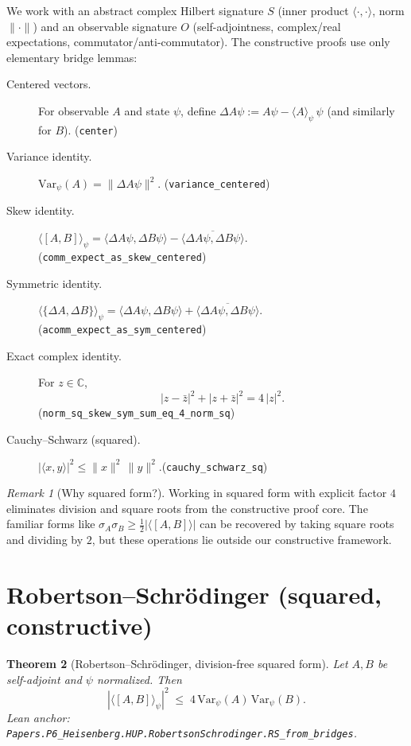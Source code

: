 \documentclass[11pt]{article}
\newcommand{\lean}[1]{\texttt{#1}}
\newcommand{\leanok}{\text{\tiny [✓ Lean Verified]}}
\newcommand{\C}{\mathbb{C}}
\newcommand{\ip}[2]{\langle #1, #2 \rangle}
\newcommand{\E}[1]{\langle #1 \rangle}
\newcommand{\comm}[2]{[#1, #2]}
\newcommand{\acomm}[2]{\{#1, #2\}} %
\newcommand{\absC}[1]{\left| #1 \right|}
\newcommand{\abssq}[1]{\absC{#1}^{2}}
\newcommand{\Var}{\mathrm{Var}}
\theoremstyle{plain}
\newtheorem{theorem}{Theorem}[section]
\theoremstyle{definition}
\theoremstyle{remark}
\newtheorem{remark}[theorem]{Remark}
\begin{document}
We work with an abstract complex Hilbert signature $S$ (inner product $\ip{\cdot}{\cdot}$, norm $\|\cdot\|$) and an observable signature $O$ (self-adjointness, complex/real expectations, commutator/anti-commutator). The constructive proofs use only elementary bridge lemmas:

\begin{description}
  \item[Centered vectors.] For observable $A$ and state $\psi$, define
  $\Delta A\psi := A\psi - \E{A}_\psi\,\psi$ (and similarly for $B$). \hfill{\small(\lean{center})}
  \item[Variance identity.] $\Var_\psi(A) = \|\Delta A\psi\|^2$. \hfill{\small(\lean{variance\_centered})}
  \item[Skew identity.] $\E{\comm{A}{B}}_\psi = \ip{\Delta A\psi}{\Delta B\psi} - \overline{\ip{\Delta A\psi}{\Delta B\psi}}$. \hfill{\small(\lean{comm\_expect\_as\_skew\_centered})}
  \item[Symmetric identity.] $\E{\acomm{\Delta A}{\Delta B}}_\psi = \ip{\Delta A\psi}{\Delta B\psi} + \overline{\ip{\Delta A\psi}{\Delta B\psi}}$. \hfill{\small(\lean{acomm\_expect\_as\_sym\_centered})}
  \item[Exact complex identity.] For $z\in\C$,
  \[
    \abssq{z-\bar z} + \abssq{z+\bar z} = 4\,\abssq{z}.
  \]
  \hfill{\small(\lean{norm\_sq\_skew\_sym\_sum\_eq\_4\_norm\_sq})}
  \item[Cauchy--Schwarz (squared).] $\abssq{\ip{x}{y}} \le \|x\|^2\,\|y\|^2$.\hfill{\small(\lean{cauchy\_schwarz\_sq})}
\end{description}

\begin{remark}[Why squared form?]
Working in squared form with explicit factor $4$ eliminates division and square roots from the constructive proof core. The familiar forms like $\sigma_A \sigma_B \geq \frac{1}{2}|\langle[A,B]\rangle|$ can be recovered by taking square roots and dividing by $2$, but these operations lie outside our constructive framework.
\end{remark}


\section{Robertson--Schrödinger (squared, constructive)}
\label{sec:RS}

\begin{theorem}[Robertson--Schrödinger, division-free squared form]\leanok
\label{thm:RS-squared}
Let $A,B$ be self-adjoint and $\psi$ normalized. Then
\[
  \abssq{\E{\comm{A}{B}}_\psi} \;\le\; 4\,\Var_\psi(A)\,\Var_\psi(B).
\]
\emph{Lean anchor:} \lean{Papers.P6\_Heisenberg.HUP.RobertsonSchrodinger.RS\_from\_bridges}.
\end{theorem}
\end{document}
